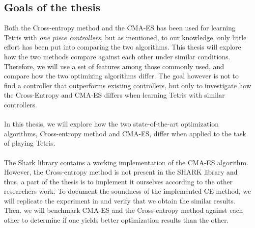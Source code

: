 \subsection{Goals of the thesis}

Both the Cross-entropy method and the CMA-ES has been used 
for learning Tetris with \textit{one piece controllers}, but as 
mentioned, to our knowledge, only little effort has been put into 
comparing the two algorithms. This thesis will explore
how the two methods compare against each other under similar
conditions. Therefore, we will use a set of features among those
commonly used, and compare how the two optimizing algorithms 
differ. The goal however is not to find a controller that 
outperforms existing controllers, but only to investigate 
how the Cross-Entropy and CMA-ES differs when learning Tetris
with similar controllers.\\
\\
In this thesis, we will explore how the two state-of-the-art
optimization algorithms, Cross-entropy method and CMA-ES, differ when 
applied to the task of playing Tetris.\\
\\
The Shark library \citep{shark08} contains a
working implementation of the CMA-ES 
algorithm. However, the Cross-entropy method 
is not present in the SHARK library and thus, 
a part of the thesis is to implement it ourselves according to 
the other researchers work. To document the 
soundness of the implemented CE method, 
we will replicate the experiment in \citep{thiery:09} and 
verify that we obtain the similar results.\\
Then, we will benchmark CMA-ES and the Cross-entropy method against each other 
to determine if one yields better optimization results than the other.

